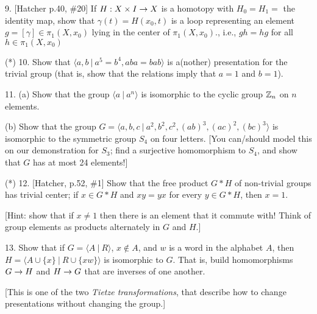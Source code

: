 \documentclass[12pt]{article}
\begin{document}
\begin{description}

\item{9.} [Hatcher p.40, \#20] If $H:X\times I\rightarrow X$ is a homotopy
with $H_0=H_1=$ the identity map, show that
$\gamma(t)=H(x_0,t)$ is a loop representing an element
$g=[\gamma]\in\pi_1(X,x_0)$ lying in the center of $\pi_1(X,x_0)$.,
i.e., $gh=hg$ for all $h\in\pi_1(X,x_0)$

\msk

\item{(*)} 10. Show that $\langle a,b\ |\ a^5=b^4,aba=bab\rangle$ is a(nother) presentation
for the trivial group (that is, show that the relations imply that $a=1$ and $b=1$).

\msk

\item{11.} (a) Show that the group $\langle a\ |\ a^n\rangle$ is isomorphic to the cyclic group 
${\mathbb Z}_n$ on $n$ elements.

\ssk

\item{\spc} (b) Show that the group $G = \langle a,b,c\ |\ a^2, b^2, c^2, (ab)^3, (ac)^2, (bc)^3\rangle$
is isomorphic to the symmetric group $S_4$ on four letters. [You can/should model this on our demonstration
for $S_3$; find a surjective homomorphism to $S_4$, and show that $G$ has at most 24 elements!]

\msk

\item{(*)} 12. [Hatcher, p.52, \#1] Show that the free product $G*H$ of non-trivial
groups has trivial center; if $x\in G*H$ and $xy=yx$ for every $y\in G*H$, then 
$x=1$. 

\ssk

\item{\spc} [Hint: show that if $x\neq 1$ then there
is an element that it  commute with! 
Think of group elements as products alternately in $G$ and $H$.]

\msk

\item{13.} Show that if $G=\langle A\ |\ R\rangle$, $x\not\in A$, and $w$ is a word in
the alphabet $A$, then $H=\langle A\cup\{x\}\ |\ R\cup\{xw\}\rangle$ is 
isomorphic to $G$. That is, build homomorphisms $G\rightarrow H$ and $H\rightarrow G$ that are
inverses of one another.

\msk

\item{\spc} [This is one of the two {\it Tietze transformations}, that describe how to 
change presentations without changing the group.]


\end{description}
\end{document}
